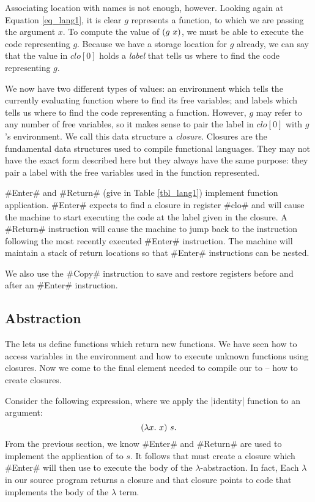 \documentclass[12pt]{report}
\begin{document}
Associating location with names is not enough, however. Looking again
at Equation \ref{eq_lang1}, it is clear $g$ represents a function, to
which we are passing the argument $x$. To compute the value of
$(g\ x)$, we must be able to execute the code representing
$g$. Because we have a storage location for $g$ already, we can
say that the value in $clo[0]$ holds a \emph{label} that tells us
where to find the code representing $g$. 

We now have two different types of values: an environment which tells
the currently evaluating function where to find its free variables;
and labels which tells us where to find the code representing a
function. However, $g$ may refer to any number of free variables, so
it makes sense to pair the label in $clo[0]$ with $g$'s
environment. We call this data structure a \emph{closure}. Closures
are the fundamental data structures used to compile functional
languages. They may not have the exact form described here but they
always have the same purpose: they pair a label with the free
variables used in the function represented.

#Enter# and #Return# (give in Table \ref{tbl_lang1}) implement
function application. #Enter# expects to find a closure in register
#clo# and will cause the machine to start executing the code at the
label given in the closure. A #Return# instruction will cause the
machine to jump back to the instruction following the most recently
executed #Enter# instruction. The machine will maintain a stack of
return locations so that #Enter# instructions can be nested.

We also use the #Copy# instruction to save and restore registers before
and after an #Enter# instruction. 

\subsection{Abstraction}
The \lamA lets us define functions which return new functions. We have
seen how to access variables in the environment and how to execute
unknown functions using closures. Now we come to the final element
needed to compile our \lamA to \machLam -- how to create
closures.

Consider the following expression, where we apply the |identity|
function to an argument:
\[(\lambda x.\ x)\ s.\]
From the previous section, we know #Enter# and #Return# are used to
implement the application of  to $s$. It follows that
 must create a closure which #Enter# will then use to
execute the body of the $\lambda$-abstraction. In fact, Each
$\lambda$ in our source program returns a closure and that closure
points to code that implements the body of the $\lambda$ term.
\end{document}
